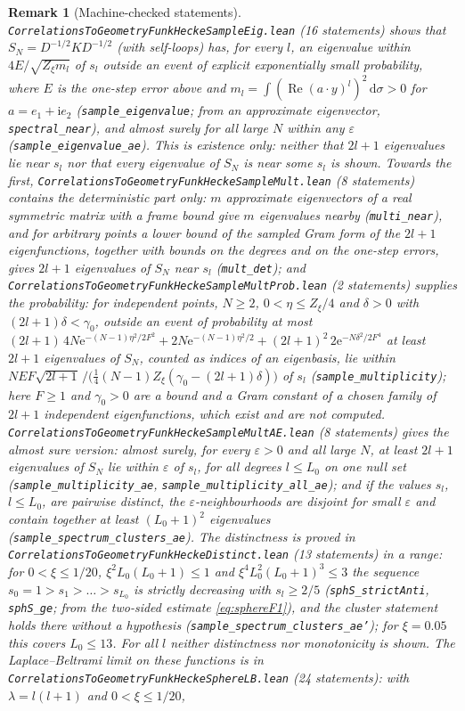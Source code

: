 \documentclass[11pt,a4paper]{article}
\theoremstyle{stmt}
\theoremstyle{defn}
\theoremstyle{rmk}
\newtheorem{remark}[theorem]{Remark}
\numberwithin{equation}{section}
\newcommand{\dd}{\mathrm{d}}
\begin{document}
{\begin{remark}[Machine-checked statements]
\texttt{CorrelationsToGeometryFunkHeckeSampleEig.lean} (16 statements) shows that $S_N=D^{-1/2}KD^{-1/2}$ (with self-loops) has, for every $l$, an eigenvalue within $4E/\sqrt{Z_\xi m_l}$ of $s_l$ outside an event of explicit exponentially small probability, where $E$ is the one-step error above and $m_l=\int(\operatorname{Re}(a\cdot y)^l)^2\,\dd\sigma>0$ for $a=e_1+\mathrm ie_2$ (\texttt{sample\_eigenvalue}; from an approximate eigenvector, \texttt{spectral\_near}), and almost surely for all large $N$ within any $\varepsilon$ (\texttt{sample\_eigenvalue\_ae}). This is existence only: neither that $2l+1$ eigenvalues lie near $s_l$ nor that every eigenvalue of $S_N$ is near some $s_l$ is shown. Towards the first, \texttt{CorrelationsToGeometryFunkHeckeSampleMult.lean} (8 statements) contains the deterministic part only: $m$ approximate eigenvectors of a real symmetric matrix with a frame bound give $m$ eigenvalues nearby (\texttt{multi\_near}), and for arbitrary points a lower bound of the sampled Gram form of the $2l+1$ eigenfunctions, together with bounds on the degrees and on the one-step errors, gives $2l+1$ eigenvalues of $S_N$ near $s_l$ (\texttt{mult\_det}); and \texttt{CorrelationsToGeometryFunkHeckeSampleMultProb.lean} (2 statements) supplies the probability: for independent points, $N\ge2$, $0<\eta\le Z_\xi/4$ and $\delta>0$ with $(2l+1)\delta<\gamma_0$, outside an event of probability at most $(2l+1)\,4N\mathrm e^{-(N-1)\eta^2/2F^2}+2N\mathrm e^{-(N-1)\eta^2/2}+(2l+1)^2\,2\mathrm e^{-N\delta^2/2F^4}$ at least $2l+1$ eigenvalues of $S_N$, counted as indices of an eigenbasis, lie within $N E F\sqrt{2l+1}\,/\big(\tfrac14(N-1)Z_\xi(\gamma_0-(2l+1)\delta)\big)$ of $s_l$ (\texttt{sample\_multiplicity}); here $F\ge1$ and $\gamma_0>0$ are a bound and a Gram constant of a chosen family of $2l+1$ independent eigenfunctions, which exist and are not computed. \texttt{CorrelationsToGeometryFunkHeckeSampleMultAE.lean} (8 statements) gives the almost sure version: almost surely, for every $\varepsilon>0$ and all large $N$, at least $2l+1$ eigenvalues of $S_N$ lie within $\varepsilon$ of $s_l$, for all degrees $l\le L_0$ on one null set (\texttt{sample\_multiplicity\_ae}, \texttt{sample\_multiplicity\_all\_ae}); and if the values $s_l$, $l\le L_0$, are pairwise distinct, the $\varepsilon$-neighbourhoods are disjoint for small $\varepsilon$ and contain together at least $(L_0+1)^2$ eigenvalues (\texttt{sample\_spectrum\_clusters\_ae}). The distinctness is proved in \texttt{CorrelationsToGeometryFunkHeckeDistinct.lean} (13 statements) in a range: for $0<\xi\le1/20$, $\xi^2L_0(L_0+1)\le1$ and $\xi^4L_0^2(L_0+1)^3\le3$ the sequence $s_0=1>s_1>\dots>s_{L_0}$ is strictly decreasing with $s_l\ge2/5$ (\texttt{sphS\_strictAnti}, \texttt{sphS\_ge}; from the two-sided estimate \eqref{eq:sphereF1}), and the cluster statement holds there without a hypothesis (\texttt{sample\_spectrum\_clusters\_ae'}); for $\xi=0.05$ this covers $L_0\le13$. For all $l$ neither distinctness nor monotonicity is shown. The Laplace--Beltrami limit on these functions is in \texttt{CorrelationsToGeometryFunkHeckeSphereLB.lean} (24 statements): with $\lambda=l(l+1)$ and $0<\xi\le1/20$, 
\end{remark}}
\end{document}
